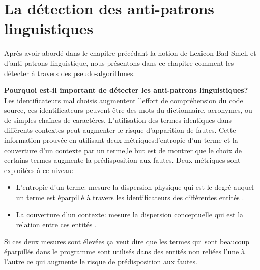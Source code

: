 \chapter{La détection des anti-patrons linguistiques}
Après avoir abordé dans le chapitre précédant la notion de Lexicon Bad Smell et d'anti-patrons linguistique, nous présentons dans ce chapitre comment les détecter à travers des pseudo-algorithmes.

\vspace{0.5cm}
\newline
\textbf{Pourquoi est-il important de détecter les anti-patrons linguistiques?}\\
Les identificateurs mal choisis augmentent l’effort de compréhension du code source, ces identificateurs peuvent être des mots du dictionnaire, acronymes, ou de simples chaînes de caractères.
\newline
L’utilisation des termes identiques dans différents contextes peut augmenter le risque d’apparition de fautes. Cette information prouvée en utilisant deux métriques:l’entropie d’un terme et la couverture d’un contexte par un terme,le but est de montrer que le choix de certains termes augmente la prédisposition aux fautes. Deux métriques sont exploitées à ce niveau:
\begin{itemize}
    

\item L’entropie d'un terme:  mesure la dispersion physique qui est  le degré auquel un terme est éparpillé à travers les identificateurs des différentes entités \cite{arnaoudova2010defining}.
\item La couverture d’un contexte: mesure la dispersion conceptuelle qui est la relation entre ces entités \cite{arnaoudova2010defining}.
\end{itemize}
Si ces deux mesures sont élevées ça veut dire que les termes qui sont beaucoup éparpillés dans le programme  sont utilisés dans des entités non reliées l’une à l’autre  ce qui augmente le risque de prédisposition aux fautes.\\

